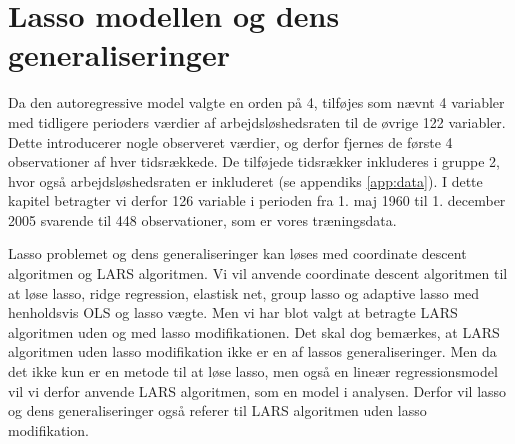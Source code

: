 \chapter{Lasso modellen og dens generaliseringer}
Da den autoregressive model valgte en orden på 4, tilføjes som nævnt 
4 variabler med tidligere perioders værdier af arbejdsløshedsraten til de øvrige 122 variabler. 
Dette introducerer nogle observeret værdier, og derfor fjernes de første 4 observationer af hver tidsrækkede.
De tilføjede tidsrækker inkluderes i gruppe 2, hvor også arbejdsløshedsraten er inkluderet (se appendiks \ref{app:data}).
I dette kapitel betragter vi derfor 126 variable i perioden fra 1. maj 1960 til 1. december 2005 svarende til 448 observationer, som er vores træningsdata. 

Lasso problemet og dens generaliseringer kan løses med coordinate descent algoritmen og LARS algoritmen.
Vi vil anvende coordinate descent algoritmen til at løse lasso, ridge regression, elastisk net, group lasso og adaptive lasso med henholdsvis OLS og lasso vægte.
Men vi har blot valgt at betragte LARS algoritmen uden og med lasso modifikationen.
Det skal dog bemærkes, at LARS algoritmen uden lasso modifikation ikke er en af lassos generaliseringer. Men da det ikke kun er en metode til at løse lasso, men også en lineær regressionsmodel vil vi derfor anvende LARS algoritmen, som en model i analysen.  Derfor vil lasso og dens generaliseringer også referer til LARS algoritmen uden lasso modifikation.  



